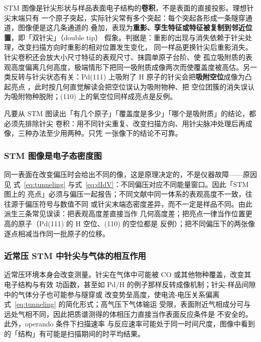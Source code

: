 STM 图像是针尖形状与样品表面电子结构的\textbf{卷积}，不是表面的直接投影。理想针尖末端只有
一个原子突起，实际针尖常有多个突起：每个突起各形成一条隧穿通道，图像便是这几条通道的
叠加，表现为\textbf{重影、孪生特征或特征被复制到邻近位置}，即「双针尖」（double tip）
假象。判据是：重影的出现与消失依赖于针尖处理，改变扫描方向时重影的相对位置发生变化，
同一样品更换针尖后重影消失。针尖卷积还会放大小尺寸特征的表观尺寸、抹圆单原子台阶、使
孤立吸附质的表观高度偏离几何高度，极端情形下把同一吸附质成像两次而使覆盖度被高估。另一
类反转与针尖状态有关：Pd(111) 上吸附了 H 原子的针尖会把\textbf{吸附空位}成像为凸起亮点
，此时按几何直觉解读会把空位误认为吸附物种、把
空位团簇的消失误认为吸附物种脱附；(110) 上的氧空位同样成亮点是反例。

\begin{pitfall}
凡要从 STM 图读出「有几个原子」「覆盖度是多少」「哪个是吸附质」的结论，都必须先排除针尖
卷积：用不同针尖重复、改变扫描方向、用针尖脉冲处理后再成像，三种办法至少用两种。只凭
一张像下的结论不可靠。
\end{pitfall}

\subsubsection{STM 图像是电子态密度图}

同一表面在改变偏压时会给出不同的像，这是原理决定的，不是仪器故障——原因见
式~\eqref{eq:tunneling} 与式~\eqref{eq:dIdV}：不同偏压对应不同能量窗口。因此「STM 图上的
亮点」必须与偏压一起报告；不同文献中同一体系的表观高度不一致，往往源于偏压符号与数值不同
或针尖末端态密度差异，而不一定是样品不同。由此派生三条常见误读：把表观高度差直接当作
几何高度差；把亮点一律当作位置更高的原子（Pd(111) 的 H 空位、(110) 的空位都是
反例）；把不同偏压下的两张像逐点相减当作同一批原子的位移。

\subsubsection{近常压 STM 中针尖与气体的相互作用}

近常压环境本身会改变测量。针尖在气体中可能被 CO 或其他物种覆盖，改变其电子结构与有效
功函数，甚至如 Pd/H 的例子那样反转成像机制；针尖-样品间隙中的气体分子也可能参与隧穿或
改变势垒高度，使电流-电压关系偏离式~\eqref{eq:tunneling} 的简化形式；高气压下气体输运
受限，表面附近气相成分可与远处气相不同，因此把质谱测得的体相压力直接当作表面反应条件是
不安全的。此外，operando 条件下扫描速率
与反应速率可能处于同一时间尺度，图像中看到的「结构」有可能是扫描期间的时平均结果。

